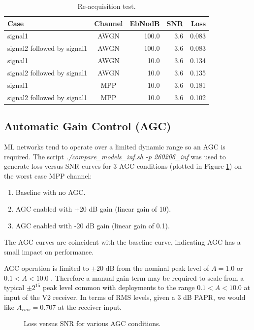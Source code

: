 \documentclass{article}
\begin{document}
\begin{table} [h]
\caption{Re-acquisition test.}
\label{tab:re_acq}
\centering
\begin{tabular}{ l | c | r | r | r }
 \hline
 Case & Channel & EbNodB & SNR & Loss \\
 \hline
 signal1                     & AWGN & 100.0 & 3.6 & 0.083 \\
 signal2 followed by signal1 & AWGN & 100.0 & 3.6 & 0.083 \\
 signal1                     & AWGN & 10.0 & 3.6 & 0.134 \\
 signal2 followed by signal1 & AWGN & 10.0 & 3.6 & 0.135 \\
 signal1                     & MPP & 10.0 & 3.6 & 0.181 \\
 signal2 followed by signal1 & MPP & 10.0 & 3.6 & 0.102 \\
  \hline
\end{tabular}
\end{table}

\subsection{Automatic Gain Control (AGC)}

ML networks tend to operate over a limited dynamic range so an AGC is required.  The script \emph{./compare\_models\_inf.sh -p 260206\_inf} was used to generate loss versus SNR curves for 3 AGC conditions (plotted in Figure \ref{fig:260206_inf_loss_SNR3k_models}) on the worst case MPP channel:
\begin{enumerate}
\item Baseline with no AGC.
\item AGC enabled with +20 \si{dB} gain (linear gain of 10).
\item AGC enabled with -20 \si{dB} gain (linear gain of 0.1).
\end{enumerate}
The AGC curves are coincident with the baseline curve, indicating AGC has a small impact on performance.

AGC operation is limited to $\pm 20$  \si{dB} from the nominal peak level of $A=1.0$ or $0.1<A<10.0$ .  Therefore a manual gain term may be required to scale from a typical $\pm 2^{15}$ peak level common with deployments to the range $0.1<A<10.0$ at input of the V2 receiver.  In terms of RMS levels, given a 3 \si{dB} PAPR, we would like $A_{rms}=0.707$ at the receiver input. 

\begin{figure}[h]
\caption{Loss versus SNR for various AGC conditions.}
\label{fig:260206_inf_loss_SNR3k_models}
\begin{center}
\end{center}
\end{figure}
\end{document}
